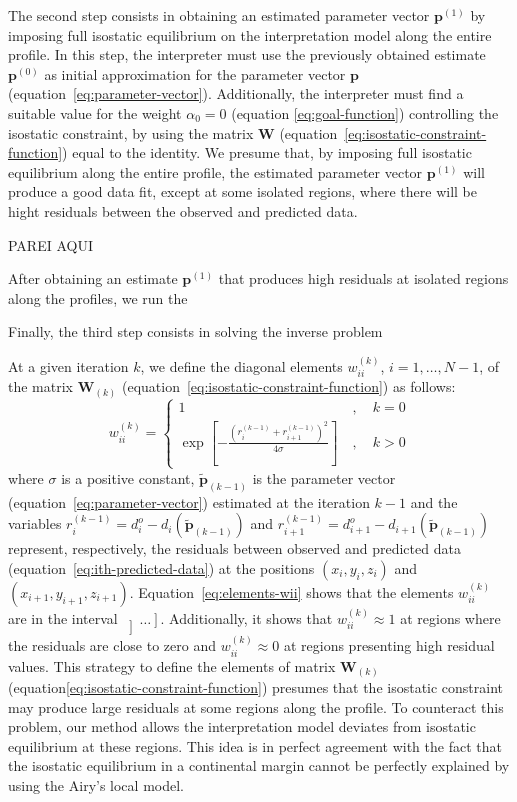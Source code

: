 \documentclass[manuscript]{geophysics}
\begin{document}
The second step consists in obtaining an estimated parameter vector $\mathbf{p}^{(1)}$
by imposing full isostatic equilibrium on the interpretation model along the entire profile.
In this step, the interpreter must use the previously obtained estimate
$\mathbf{p}^{(0)}$ as initial approximation for the parameter vector $\mathbf{p}$ 
(equation~\ref{eq:parameter-vector}). Additionally, the interpreter must find a suitable 
value for the weight $\alpha_{0} = 0$ (equation \ref{eq:goal-function}) controlling the 
isostatic constraint, by using the matrix $\mathbf{W}$
(equation~\ref{eq:isostatic-constraint-function}) equal to the identity.
We presume that, by imposing full isostatic equilibrium along the entire profile,
the estimated parameter vector $\mathbf{p}^{(1)}$ will produce a good data fit,
except at some isolated regions, where there will be hight residuals between the
observed and predicted data. 

PAREI AQUI

After obtaining an estimate $\mathbf{p}^{(1)}$ that produces high residuals at isolated
regions along the profiles, we run the 

Finally, the third step consists in solving the inverse problem


At a given iteration $k$, we define the diagonal elements $w_{ii}^{(k)}$, $i = 1, \dots, N - 1$,
of the matrix $\mathbf{W}_{(k)}$ (equation~\ref{eq:isostatic-constraint-function}) as follows:
\begin{equation} \label{eq:elements-wii}
w_{ii}^{(k)} = \begin{cases}
1 \: &, \quad k = 0 \\
\exp \left[ - \frac{ \left( r_{i}^{(k-1)} + r_{i+1}^{(k-1)} \right)^{2}}{4 \sigma} \right]
\: &, \quad k > 0
\end{cases}
\end{equation}
where $\sigma$ is a positive constant, $\tilde{\mathbf{p}}_{(k-1)}$ is the
parameter vector (equation~\ref{eq:parameter-vector}) estimated at the iteration $k-1$
and the variables
$r_{i}^{(k-1)} = d^{o}_{i} - d_{i} \left( \tilde{\mathbf{p}}_{(k-1)} \right)$ and 
$r_{i+1}^{(k-1)} = d^{o}_{i+1} - d_{i+1} \left(\tilde{\mathbf{p}}_{(k-1)} \right)$ represent,
respectively, the residuals between observed and predicted data
(equation~\ref{eq:ith-predicted-data}) at the positions $(x_{i}, y_{i}, z_{i})$ and 
$(x_{i+1}, y_{i+1}, z_{i+1})$. Equation~\ref{eq:elements-wii} shows that the elements 
$w_{ii}^{(k)}$ are in the interval $\left] \dots \right]$. Additionally, it shows that
$w_{ii}^{(k)} \approx 1$ at regions where the residuals are close to zero and 
$w_{ii}^{(k)} \approx 0$ at regions presenting high residual values. 
This strategy to define the elements of matrix $\mathbf{W}_{(k)}$ 
(equation\ref{eq:isostatic-constraint-function}) presumes that the isostatic constraint may
produce large residuals at some regions along the profile. To counteract this problem,
our method allows the interpretation model deviates from isostatic equilibrium at these 
regions. This idea is in perfect agreement with the fact that the isostatic equilibrium
in a continental margin cannot be perfectly explained by using the Airy's local model.
\end{document}
